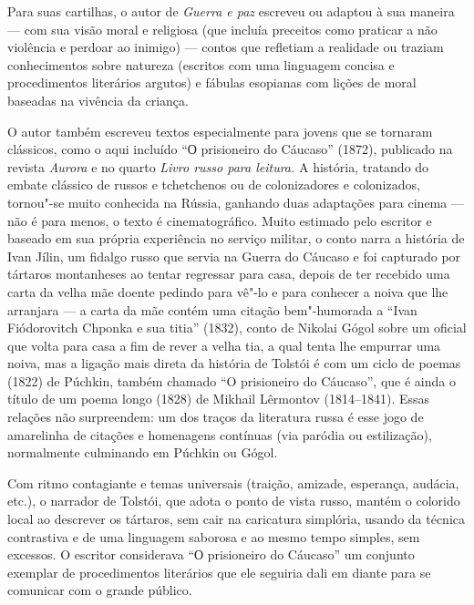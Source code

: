 Para suas cartilhas, o autor de \emph{Guerra e paz} escreveu ou adaptou
à sua maneira --- com sua visão moral e religiosa (que incluía preceitos
como praticar a não violência e perdoar ao inimigo) --- contos que
refletiam a realidade ou traziam conhecimentos sobre natureza (escritos
com uma linguagem concisa e procedimentos literários argutos) e fábulas
esopianas com lições de moral baseadas na vivência da criança.

O autor também escreveu textos especialmente para jovens que se tornaram
clássicos, como o aqui incluído ``О prisioneiro do Cáucaso'' (1872),
publicado na revista \emph{Aurora} e no quarto \emph{Livro russo para
leitura.} A história, tratando do embate clássico de russos e
tchetchenos ou de colonizadores e colonizados, tornou"-se muito conhecida
na Rússia, ganhando duas adaptações para cinema --- não é para menos, o
texto é cinematográfico. Muito estimado pelo escritor e baseado em
sua própria experiência no serviço militar, o conto narra a história de
Ivan Jílin, um fidalgo russo que servia na Guerra do Cáucaso e foi
capturado por tártaros montanheses ao tentar regressar para casa, depois
de ter recebido uma carta da velha mãe doente pedindo para vê"-lo e para
conhecer a noiva que lhe arranjara --- a carta da mãe contém uma citação
bem"-humorada a ``Ivan Fiódorovitch Chponka e sua titia''
(1832), conto de Nikolai Gógol sobre um oficial que volta para casa a fim de rever a velha tia, a qual tenta lhe
empurrar uma noiva, mas a ligação mais direta da história de Tolstói é
com um ciclo de poemas (1822) de Púchkin, também chamado ``O prisioneiro
do Cáucaso'', que é ainda o título de um poema longo (1828) de
Mikhail Lêrmontov (1814--1841). Essas relações não surpreendem: um dos
traços da literatura russa é esse jogo de amarelinha de citações e
homenagens contínuas (via paródia ou estilização), normalmente
culminando em Púchkin ou Gógol.

Com ritmo contagiante e temas universais (traição, amizade, esperança,
audácia, etc.), o narrador de Tolstói, que adota o ponto de vista
russo, mantém o colorido local ao descrever os tártaros, sem cair na
caricatura simplória, usando da técnica contrastiva e de uma linguagem
saborosa e ao mesmo tempo simples, sem excessos. O escritor considerava ``О
prisioneiro do Cáucaso'' um conjunto exemplar de procedimentos
literários que ele seguiria dali em diante para se comunicar com o
grande público.

